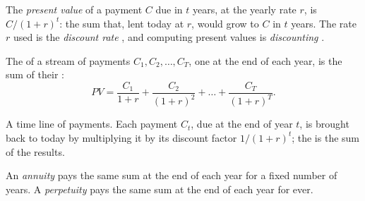 \begin{definition}\label{def:g12:present-value:present-value}
The \emph{present value} of a payment $C$ due in $t$ years, at the yearly rate $r$, is $C/(1 + r)^t$: the sum that, lent today at $r$, would grow to
$C$ in $t$ years. The rate $r$ used is the \emph{discount rate}%
\label{def:g12:present-value:discount-rate}, and computing present values is \emph{discounting}%
\label{def:g12:present-value:discounting}.
\end{definition}

The  of a stream of payments $C_1, C_2, \dots, C_T$, one at the end of each year, is the sum of their :
\[ PV = \frac{C_1}{1 + r} + \frac{C_2}{(1 + r)^2} + \dots + \frac{C_T}{(1 + r)^T}. \]

\begin{omfigure}

{\small A time line of payments. Each payment $C_t$, due at the end of year $t$, is brought back to today by multiplying it by its discount factor $1/(1 + r)^t$; the
 is the sum of the results.}
\end{omfigure}

\begin{definition}\label{def:g12:present-value:annuity}
An \emph{annuity} pays the same sum at the end of each year for a fixed number of years. A \emph{perpetuity}%
\label{def:g12:present-value:perpetuity} pays the same sum at the end of each year for ever.
\end{definition}

